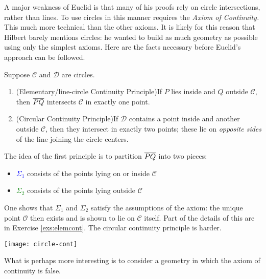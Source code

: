 A major weakness of Euclid is that many of his proofs rely on circle intersections, rather than lines. To use circles in this manner requires the \emph{Axiom of Continuity.} 
This much more technical than the other axioms. It is likely for this reason that Hilbert barely mentions circles: he wanted to build as much geometry as possible using only the simplest axioms.\smallbreak
Here are the facts necessary before Euclid's approach can be followed.

\begin{thm}{}{}
	Suppose $\mathcal C$ and $\mathcal D$ are circles.\vspace{-5pt}
	\begin{enumerate}\itemsep0pt
	  \item (Elementary/line-circle Continuity Principle)\quad If $P$ lies inside and $Q$ outside $\mathcal C$, then $\overline{PQ}$ intersects $\mathcal C$ in exactly one point.
	  \item (Circular Continuity Principle)\quad If $\mathcal D$ contains a point inside and another outside $\mathcal C$, then they intersect in exactly two points; these lie on \emph{opposite sides} of the line joining the circle centers.
	\end{enumerate}
\end{thm}


\begin{minipage}[t]{0.73\linewidth}\vspace{0pt}
	The idea of the first principle is to partition $\overline{PQ}$ into two pieces:
	\begin{itemize}\itemsep0pt
	  \item[]\textcolor{blue}{$\Sigma_1$} consists of the points lying on or inside $\mathcal C$
	  \item[]\textcolor{Green}{$\Sigma_2$} consists of the points lying outside $\mathcal C$
	\end{itemize}
	One shows that $\Sigma_1$ and $\Sigma_2$ satisfy the assumptions of the axiom: the unique point $\mathcal O$ then exists and is shown to lie on $\mathcal C$ itself. Part of the details of this are in Exercise \ref{exs:elemcont}. The circular continuity principle is harder.
\end{minipage}
\hfill
\begin{minipage}[t]{0.25\linewidth}\vspace{0pt}
	\flushright
	\texttt{[image: circle-cont]}
\end{minipage}
\medbreak

What is perhaps more interesting is to consider a geometry in which the axiom of continuity is false.


